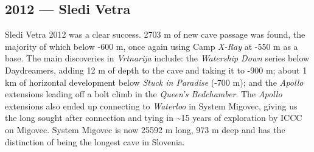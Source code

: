 \begin{tcolorbox}
\chapter{2012 --- Sledi Vetra}

Sledi Vetra 2012 was a clear success. 2703 m of new cave passage was
found, the majority of which below -600 m, once again using Camp
\emph{X-Ray} at -550 m as a base. The main discoveries in
\emph{Vrtnarija} include: the \emph{Watership Down} series below
Daydreamers, adding 12 m of depth to the cave and taking it to -900 m;
about 1 km of horizontal development below \emph{Stuck in Paradise}
(-700 m); and the \emph{Apollo} extensions leading off a bolt climb in
the \emph{Queen's Bedchamber}. The \emph{Apollo} extensions also ended
up connecting to \emph{Waterloo} in System Migovec, giving us the long
sought after connection and tying in \textasciitilde 15 years of
exploration by ICCC on Migovec. System Migovec is now 25592 m long, 973
m deep and has the distinction of being the longest cave in Slovenia.

\end{tcolorbox}
\BgThispage









